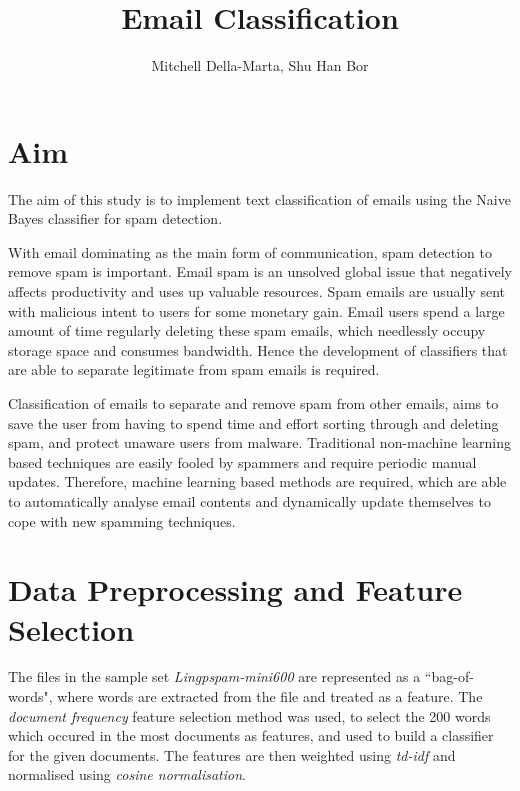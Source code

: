 \documentclass[10pt, a4paper]{article}
\title{Email Classification}
\author{Mitchell Della-Marta, Shu Han Bor}
\date{}
\begin{document}
\maketitle

\section{Aim}

The aim of this study is to implement text classification of emails using the Naive Bayes classifier for spam detection.

With email dominating as the main form of communication, spam detection to remove spam is important. Email spam is an unsolved global issue that negatively affects productivity and uses up valuable resources. Spam emails are usually sent with malicious intent to users for some monetary gain. Email users spend a large amount of time regularly deleting these spam emails, which needlessly occupy storage space and consumes bandwidth. Hence the development of classifiers that are able to separate legitimate from spam emails is required.

Classification of emails to separate and remove spam from other emails, aims to save the user from having to spend time and effort sorting through and deleting spam, and protect unaware users from malware. Traditional non-machine learning based techniques are easily fooled by spammers and require periodic manual updates. Therefore, machine learning based methods are required, which are able to automatically analyse email contents and dynamically update themselves to cope with new spamming techniques.

\section{Data Preprocessing and Feature Selection}
The files in the sample set \emph{Lingpspam-mini600} are represented as a ``bag-of-words", where words are extracted from the file and treated as a feature. The \emph{document frequency} feature selection method was used, to select the 200 words which occured in the most documents as features, and used to build a classifier for the given documents. The features are then weighted using \emph{td-idf} and normalised using \emph{cosine normalisation}.
\end{document}
